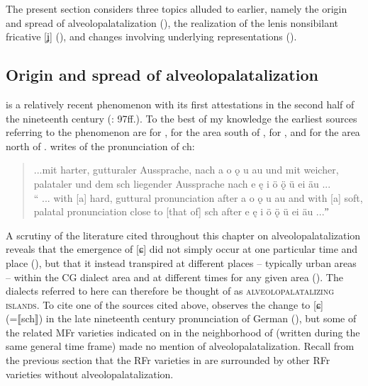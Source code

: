 \begin{xlist}
The present section considers three topics alluded to earlier, namely the origin and spread of alveolopalatalization (), the realization of the lenis nonsibilant fricative [ʝ] (), and changes involving underlying representations ().

\subsection{Origin and spread of alveolopalatalization}\label{sec:10.6.1}
\begin{sloppypar}
 is a relatively recent phenomenon with its first attestations in the second half of the nineteenth century (\citealt{Herrgen1986}: 97ff.). To the best of my knowledge the earliest sources referring to the phenomenon are \citet[21]{Wahlenberg1877} for , \citet[281]{Trautmann1884} for the area south of , \citet{Reis1892} for , and \citet[150]{Schmitz1893} for the area north of . \citet[281]{Wahlenberg1877} writes of the pronunciation of ch:
\end{sloppypar}

\begin{quote}
  ...mit harter, gutturaler Aussprache, nach a o ǫ u au und mit weicher, pala\-ta\-ler und dem sch liegender Aussprache nach e ę i ö ǫ̈ ü ei äu ...\smallskip\\
  “ ... with [a] hard, guttural pronunciation after a o ǫ u au and with [a] soft, palatal pronunciation close to [that of] sch after e ę i ö ǫ̈ ü ei äu ...ˮ
\end{quote}

A scrutiny of the literature cited throughout this chapter on alveolopalatalization reveals that the emergence of [ɕ] did not simply occur at one particular time and place (), but that it instead transpired at different places -- typically urban areas -- within the CG dialect area and at different times for any given area (). The dialects referred to here can therefore be thought of as \textsc{alveolopalatalizing} \textsc{islands}. To cite one of the sources cited above, \citet{Reis1892} observes the change to [ɕ]  (=⟦sch⟧) in the late nineteenth century pronunciation of  German (), but some of the related MFr varieties indicated on  in the neighborhood of  (written during the same general time frame) made no mention of alveolopalatalization. Recall from the previous section that the RFr varieties in  are surrounded by other RFr varieties without alveolopalatalization.


\end{xlist}
